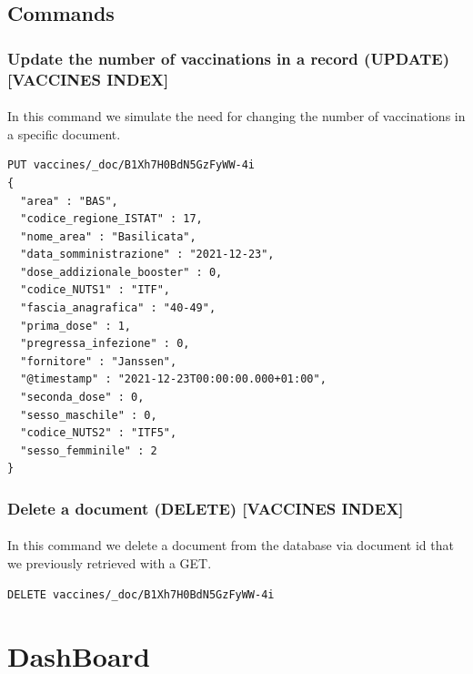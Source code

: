 \documentclass[a4paper,12pt]{article}
\begin{document}
\subsection{Commands}
\subsubsection{Update the number of vaccinations in a record (UPDATE) [VACCINES INDEX]}
\paragraph{} In this command we simulate the need for changing the number of vaccinations in a specific document.

\begin{tcolorbox}[colback=orange!5!white,colframe=orange!75!black,title=COMMAND]
\begin{verbatim}
PUT vaccines/_doc/B1Xh7H0BdN5GzFyWW-4i
{
  "area" : "BAS",
  "codice_regione_ISTAT" : 17,
  "nome_area" : "Basilicata",
  "data_somministrazione" : "2021-12-23",
  "dose_addizionale_booster" : 0,
  "codice_NUTS1" : "ITF",
  "fascia_anagrafica" : "40-49",
  "prima_dose" : 1,
  "pregressa_infezione" : 0,
  "fornitore" : "Janssen",
  "@timestamp" : "2021-12-23T00:00:00.000+01:00",
  "seconda_dose" : 0,
  "sesso_maschile" : 0,
  "codice_NUTS2" : "ITF5",
  "sesso_femminile" : 2
}
\end{verbatim}
\end{tcolorbox}

\subsubsection{Delete a document (DELETE) [VACCINES INDEX] }
\paragraph{} In this command we delete a document from the database via document \textunderscore id that we previously retrieved with a GET.
\begin{tcolorbox}[colback=orange!5!white,colframe=orange!75!black,title=COMMAND]
\begin{verbatim}
DELETE vaccines/_doc/B1Xh7H0BdN5GzFyWW-4i
\end{verbatim}
\end{tcolorbox}

\clearpage
\section{DashBoard}
\end{document}
